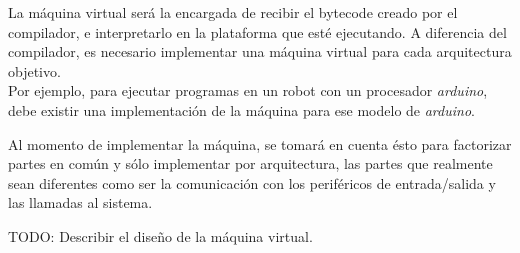   La máquina virtual será la encargada de recibir el bytecode creado por
el compilador, e interpretarlo en la plataforma que esté ejecutando.
  A diferencia del compilador, es necesario implementar una máquina virtual
para cada arquitectura objetivo.\\

  Por ejemplo, para ejecutar programas en un robot
  con un procesador \emph{arduino}, debe
  existir una implementación de la máquina para ese modelo
  de \emph{arduino}.

  Al momento de implementar la máquina, se tomará en cuenta ésto para
  factorizar partes en común y sólo implementar por arquitectura, las
  partes que realmente sean diferentes como ser la comunicación con
  los periféricos de entrada/salida y las llamadas al sistema.


TODO: Describir el diseño de la máquina virtual.
